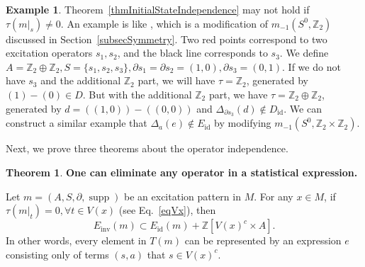 \documentclass[reprint, amsmath, amssymb, showpacs, floatfix, longbibliography, aps, twocolumn, superscriptaddress, nofootinbib]{revtex4-2}
\newcommand{\ZZ}{{\mathbb Z}}
\newcommand{\supp}{\operatorname{supp}}
\newcommand{\id}{{\operatorname{id}}}
\newcommand{\inv}{{\operatorname{inv}}}
\theoremstyle{definition}
\newtheorem{theorem}{Theorem}[section]
\newtheorem{example}{Example}[section]
\begin{document}
\begin{example}
	Theorem~\ref{thmInitialStateIndependence} may not hold if $\tau(m|_s)\ne0$. An example is like\hbox{} , which is a modification of $m_{-1}(S^0,\ZZ_2)$ discussed in Section~\ref{subsecSymmetry}. Two red points correspond to two excitation operators $s_1,s_2$, and the black line corresponds to $s_3$. We define $A=\ZZ_2\oplus\ZZ_2,S=\{s_1,s_2,s_3\},\partial s_1=\partial s_2=(1,0),\partial s_3=(0,1)$. If we do not have $s_3$ and the additional $\ZZ_2$ part, we will have $\tau=\ZZ_2$, generated by $(1)-(0)\in D$. But with the additional $\ZZ_2$ part, we have $\tau=\ZZ_2\oplus\ZZ_2$, generated by $d=((1,0))-((0,0))$ and $\Delta_{\partial s_3}(d)\notin D_{\operatorname{id}}$. We can construct a similar example that $\Delta_a(e)\notin E_{\operatorname{id}}$ by modifying $m_{-1}(S^0,\ZZ_2\times \ZZ_2)$.
	
	
	

\end{example}

Next, we prove three theorems about the operator independence.

\begin{theorem}\label{thmReplacable1}
	\textbf{One can eliminate any operator in a  statistical expression.}
	
	Let $m=(A,S,\partial,\supp)$ be an excitation pattern in $M$. For any $x\in M$, if $\tau(m|_t)=0,\forall t\in V(x)$ (see Eq.~\eqref{eqVx}), then 
	\begin{equation}
		E_\inv(m)\subset E_\id(m)+\ZZ[V(x)^c\times A].
	\end{equation}
	In other words,	every element in $T(m)$ can be represented by an expression $e$ consisting only of terms $(s,a)$ that $s\in V(x)^c$.
\end{theorem}
\end{document}
